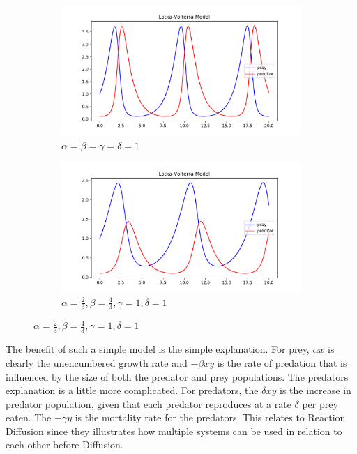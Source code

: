 \documentclass[12pt, letterpaper]{article}
\begin{document}
\begin{figure}[!h]
  \caption{Examples of the Lotka-Volterra Model}
  \label{fig:lotkaVolterra}
  \begin{center}
    \begin{subfigure}[b]{.45\linewidth}
      \includegraphics[width=\linewidth]{LotkaVolterra/lotkaVolterra1}
      \caption{$ \alpha = \beta = \gamma = \delta = 1$}
    \end{subfigure}
    \begin{subfigure}[b]{.45\linewidth}
      \includegraphics[width=\linewidth]{LotkaVolterra/lotkaVolterra2}
      \caption{$ \alpha = \frac{2}{3}, \beta = \frac{4}{3}, \gamma = 1, \delta = 1 $}
    \end{subfigure}
  \end{center}
\end{figure}


The benefit of such a simple model is the simple explanation. For prey, $\alpha x$ is clearly the unencumbered
growth rate and $-\beta x y$ is the rate of predation that is influenced by the size of both the predator and
prey populations. The predators explanation is a little more complicated. For predators, the $\delta x y$ is
the increase in predator population, given that each predator reproduces at a rate $\delta$ per prey eaten.
The $- \gamma y$ is the mortality rate for the predators. This relates to Reaction Diffusion since they
illustrates how multiple systems can be used in relation to each other before Diffusion.
\end{document}
